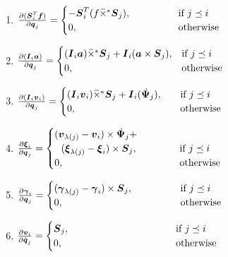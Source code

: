 \documentclass[letterpaper, 10 pt, conference]{ieeetran}  %
\begin{document}
{\begin{enumerate}[label=J{{\arabic*}}.]
      \item $ \frac{\partial (\boldsymbol{S}_{i}^{T} \boldsymbol{f})}{\partial \boldsymbol{q}_{j}}=
    \begin{cases}
      -\boldsymbol{S}_{i}^{T} (f \,\overline{\!\times\!}{}^{\,*}  \boldsymbol{S}_{j}) , &~~~~~~~~~~~~ \text{if}\ j \preceq i \\
      0, &~~~~~~~~~~~~ \text{otherwise}
    \end{cases}$

     
     \item $\frac{\partial (\boldsymbol{I}{}_{i} \boldsymbol{a})}{\partial \boldsymbol{q}_{j}} =
    \begin{cases}
     (\boldsymbol{I}{}_{i} \boldsymbol{a}) \,\overline{\!\times\!}{}^{\,*} \boldsymbol{S}_{j} +\boldsymbol{I}{}_{i}(\boldsymbol{a} \times \boldsymbol{S}_{j})   , & \text{if}\ j \preceq i \\
      0, & \text{otherwise}
    \end{cases}$
    
    
     \item $\frac{\partial (\boldsymbol{I}{}_{i} \boldsymbol{v}_{i})}{\partial \boldsymbol{q}_{j}}  =
    \begin{cases}
    (\boldsymbol{I}{}_{i} \boldsymbol{v}_{i}) \,\overline{\!\times\!}{}^{\,*} \boldsymbol{S}_{j} + \boldsymbol{I}{}_{i}(\,\dot{\!\boldsymbol{\Psi}}_{j})  , &~~~ \text{if}\ j \preceq i \\
      0, &~~~ \text{otherwise}
    \end{cases}$
    

     \item $\frac{\partial \boldsymbol{\xi}_{i}}{\partial \boldsymbol{q}_{j}}=
    \begin{cases}
       (\boldsymbol{v}_{\lambda(j)} - \boldsymbol{v}_{i} )  \times  \,\dot{\!\boldsymbol{\Psi}}_{j} + \\
       ~~( \boldsymbol{\xi}_{\lambda(j)} - \boldsymbol{\xi}_{i}  ) \times  \boldsymbol{S}_{j}   , &~~~~~~~~~~ \text{if}\ j \preceq i \\
      0, &~~~~~~~~~~ \text{otherwise}
    \end{cases}$
    
       
       \item $\frac{\partial \boldsymbol{\gamma}_{i}}{\partial \boldsymbol{q}_{j}}=
    \begin{cases}
       (\boldsymbol{\gamma}_{\lambda(j)} - \boldsymbol{\gamma}_{i})  \times \boldsymbol{S}_{j} , &~~~~~~~~~~~~ \text{if}\ j \preceq i \\
      0, &~~~~~~~~~~~~ \text{otherwise}
    \end{cases}$
    
        \item $\frac{\partial \boldsymbol{v}_{i}}{\partial \dot{\boldsymbol{q}}_{j}}=
    \begin{cases}
          \boldsymbol{S}_{j}, &~~~~~~~~~~~~~~~~~~~~~~~~~~~~~~ \text{if}\ j \preceq i \\
      0, &~~~~~~~~~~~~~~~~~~~~~~~~~~~~~~ \text{otherwise}
    \end{cases}$  
    

\end{enumerate}}
\end{document}
